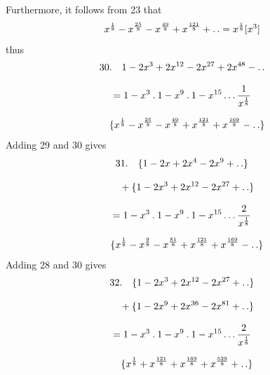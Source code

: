 Furthermore, it follows from 23 that
\[
x^{\frac18}-x^{\frac{25}{8}}-x^{\frac{49}{8}}+x^{\frac{121}{8}}+\mathinner{.\,.}
 =x^{\frac18}[x^{3}]
\]
thus
\[
\begin{gathered}
30.\quad 1-2x^{3}+2x^{12}-2x^{27}+2x^{48}-\mathinner{.\,.}\\[8pt]
 =1-x^{3}\mathbin{.}1-x^{9}\mathbin{.}1-x^{15}\mathinner{.\,.\,.}\frac{1}{x^{\frac18}}
 \\[8pt]\quad{}\{x^{\frac18}-x^{\frac{25}{8}}-x^{\frac{49}{8}}+x^{\frac{121}{8}}+x^{\frac{169}{8}}-\mathinner{.\,.}\}
\end{gathered}
\]
Adding 29 and 30 gives
\[
\begin{gathered}
31.\quad \{1-2x+2x^{4}-2x^{9}+\mathinner{.\,.}\}\\[8pt]\quad{}+\{1-2x^{3}+2x^{12}-2x^{27}+\mathinner{.\,.}\}\\[8pt]
 =1-x^{3}\mathbin{.}1-x^{9}\mathbin{.}1-x^{15}\mathinner{.\,.\,.}\frac{2}{x^{\frac18}}
 \\[8pt]\quad{}\{x^{\frac18}-x^{\frac98}-x^{\frac{81}{8}}+x^{\frac{121}{8}}+x^{\frac{169}{8}}-\mathinner{.\,.}\}
\end{gathered}
\]
Adding 28 and 30 gives
\[
\begin{gathered}
32.\quad \{1-2x^{3}+2x^{12}-2x^{27}+\mathinner{.\,.}\}\\[8pt]\quad{}+\{1-2x^{9}+2x^{36}-2x^{81}+\mathinner{.\,.}\}\\[8pt]
 =1-x^{3}\mathbin{.}1-x^{9}\mathbin{.}1-x^{15}\mathinner{.\,.\,.}\frac{2}{x^{\frac18}}
 \\[8pt]\quad{}\{x^{\frac18}+x^{\frac{121}{8}}+x^{\frac{169}{8}}+x^{\frac{529}{8}}+\mathinner{.\,.}\}
\end{gathered}
\]
\clearpage
\endgroup
